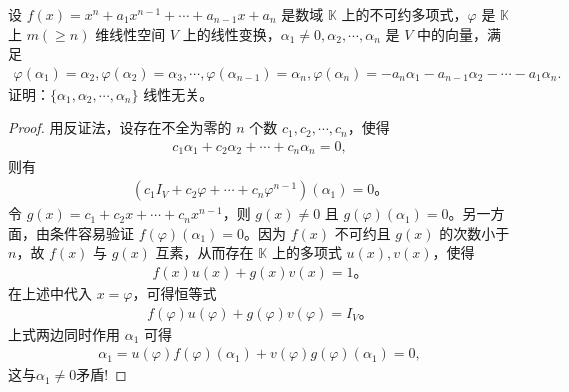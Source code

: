 \documentclass[../../main.tex]{subfiles}%
\begin{document}
\begin{proposition}\label{proposition:不可约多项式与向量组线性无关}
设 $f(x) = x^n + a_1 x^{n-1} + \cdots + a_{n-1} x + a_n$ 是数域 $\mathbb{K}$ 上的不可约多项式，$\varphi$ 是 $\mathbb{K}$ 上 $m(\geqslant n)$ 维线性空间 $V$ 上的线性变换，$\alpha_1 \neq 0, \alpha_2, \cdots, \alpha_n$ 是 $V$ 中的向量，满足
\begin{align*}
\varphi (\alpha _1)=\alpha _2,\varphi (\alpha _2)=\alpha _3,\cdots ,\varphi (\alpha _{n-1})=\alpha _n,\varphi (\alpha _n)=-a_n\alpha _1-a_{n-1}\alpha _2-\cdots -a_1\alpha _n.
\end{align*}
证明：$\{\alpha_1, \alpha_2, \cdots, \alpha_n\}$ 线性无关。
\end{proposition}
\begin{proof}

用反证法，设存在不全为零的 $n$ 个数 $c_1, c_2, \cdots, c_n$，使得
\begin{align*}
c_1 \alpha_1 + c_2 \alpha_2 + \cdots + c_n \alpha_n = 0,
\end{align*}
则有
\begin{align*}
(c_1 I_V + c_2 \varphi + \cdots + c_n \varphi^{n-1})(\alpha_1) = 0。
\end{align*}
令 $g(x) = c_1 + c_2 x + \cdots + c_n x^{n-1}$，则 $g(x) \neq 0$ 且 $g(\varphi)(\alpha_1) = 0$。另一方面，由条件容易验证 $f(\varphi)(\alpha_1) = 0$。因为 $f(x)$ 不可约且 $g(x)$ 的次数小于 $n$，故 $f(x)$ 与 $g(x)$ 互素，从而存在 $\mathbb{K}$ 上的多项式 $u(x), v(x)$，使得
\begin{align*}
f(x)u(x) + g(x)v(x) = 1。
\end{align*}
在上述中代入 $x = \varphi$，可得恒等式
\begin{align*}
f(\varphi)u(\varphi) + g(\varphi)v(\varphi) = I_V。
\end{align*}
上式两边同时作用 $\alpha_1$ 可得
\begin{align*}
\alpha_1 = u(\varphi)f(\varphi)(\alpha_1) + v(\varphi)g(\varphi)(\alpha_1) = 0,
\end{align*}
这与$\alpha_1\ne 0$矛盾!

\end{proof}
\end{document}
